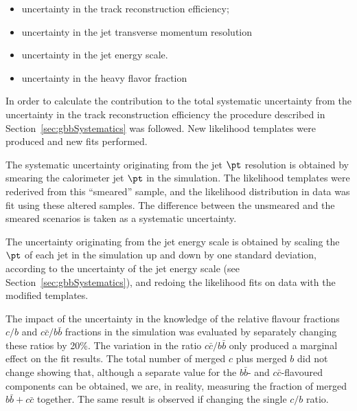 \begin{itemize}\addtolength{\itemsep}{-0.4\baselineskip}
\item
uncertainty in the track reconstruction efficiency;
\item
uncertainty in the jet transverse momentum resolution 
\item
uncertainty in the jet energy scale.
\item
uncertainty in the heavy flavor fraction
\end{itemize}


In order to calculate the contribution to the total systematic uncertainty from the uncertainty in the track reconstruction efficiency the procedure described in Section~\ref{sec:gbbSystematics} was followed. New likelihood templates were produced and new fits performed. 

The systematic uncertainty originating from the jet  $\pt$ resolution is obtained by smearing the calorimeter jet $\pt$ in the simulation. The likelihood templates were rederived from this ``smeared'' sample, and the likelihood distribution in data was fit using these altered samples. The difference between the unsmeared and the smeared scenarios is taken as a systematic uncertainty. 

The uncertainty originating from the jet energy scale is obtained by scaling the $\pt$ of each jet in the simulation up and down by one standard deviation, according to the uncertainty of the jet energy scale (see Section~\ref{sec:gbbSystematics}), and redoing the likelihood fits on data with the modified  %
templates.

The impact of the uncertainty in the knowledge of the relative flavour fractions $c/b$ and $c\bar{c}/b\bar{b}$ fractions in the simulation was evaluated by separately changing these ratios by 20\%. The variation in the ratio $c\bar{c}/b\bar{b}$ only produced a marginal effect on the fit results. The total number of merged $c$ plus merged $b$ did not change showing that, although a separate value for the $b\bar{b}$- and $c\bar{c}$-flavoured components can be obtained, we are,  in reality, measuring the fraction of merged $b\bar{b}+c\bar{c}$ together. The same result is observed if changing the single $c/b$ ratio.

